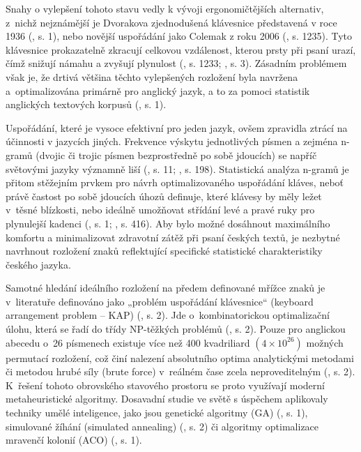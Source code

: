 \documentclass[a4paper, twoside, 12pt, czech]{article}
\begin{document}
Snahy o vylepšení tohoto stavu vedly k vývoji ergonomičtějších alternativ, z~nichž 
nejznámější je Dvorakova zjednodušená klávesnice představená v roce 1936 (\cite{applicationAlgo}, s. 1), nebo novější 
uspořádání jako Colemak z roku 2006 (\cite{qwerty-dilemma}, s. 1235). Tyto klávesnice prokazatelně zkracují celkovou 
vzdálenost, kterou prsty při psaní urazí, čímž snižují námahu a zvyšují plynulost (\cite{qwerty-dilemma}, s. 1233; \cite{applicationAlgo}, s. 3). 
Zásadním problémem však je, že drtivá většina těchto vylepšených rozložení byla 
navržena a~optimalizována primárně pro anglický jazyk, a to za pomoci statistik 
anglických textových korpusů (\cite{applicationAlgo}, s. 1).

Uspořádání, které je vysoce efektivní pro jeden jazyk, ovšem zpravidla ztrácí na 
účinnosti v jazycích jiných. Frekvence výskytu jednotlivých písmen a zejména n-gramů 
(dvojic či trojic písmen bezprostředně po sobě jdoucích) se napříč světo\-vými jazyky 
významně liší (\cite{lockin}, s. 11; \cite{textEntrySystems}, s. 198). Statistická analýza n-gramů je přitom stěžejním prvkem pro návrh 
optimalizovaného uspořádání kláves, neboť právě častost po sobě jdoucích úhozů 
definuje, které klávesy by měly ležet v~těsné blízkosti, nebo ideálně umožňovat 
střídání levé a pravé ruky pro plynulejší kadenci (\cite{applicationAlgo}, s. 1; \cite{diagramBasedLayout}, s. 416). Aby bylo možné dosáhnout maximálního 
komfortu a minimalizovat zdravotní zátěž při psaní českých textů, je nezbytné navrhnout 
rozložení znaků reflektující specifické statistické charakteristiky českého jazyka.

Samotné hledání ideálního rozložení na předem definované mřížce znaků je v~literatuře 
definováno jako „problém uspořádání klávesnice“ (keyboard arrangement problem – KAP) (\cite{applicationAlgo}, s. 2). 
Jde o~kombinatorickou optimalizační úlohu, která se řadí do třídy NP-těžkých problémů (\cite{engramapproach}, s. 2). 
Pouze pro anglickou abecedu o~26 písmenech existuje více než 400 kvadriliard $(4\times10^{26})$
možných permutací rozložení, což činí nalezení absolutního optima analytickými metodami 
či metodou hrubé síly (brute force) v~reálném čase zcela neproveditelným (\cite{engramapproach}, s. 2). K~řešení 
tohoto obrovského stavového prostoru se proto využívají moderní metaheuristické 
algoritmy. Dosavadní studie ve světě s úspěchem aplikovaly techniky umělé inteligence, 
jako jsou genetické algoritmy (GA) (\cite{applicationAlgo}, s. 1), simulované žíhání 
(simulated annealing) (\cite{applicationAlgo}, s. 2) či 
algoritmy optimalizace mravenčí kolonií (ACO) (\cite{engramapproach}, s. 1).
\end{document}
